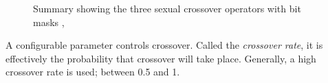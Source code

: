 \begin{figure}[tp]
   \begin{center}
   \end{center}
   \caption{Summary showing the three sexual crossover operators  with bit masks , }
   \label{fig:operators}
\end{figure}
A configurable parameter controls crossover. Called the \emph{crossover rate}, it is effectively the probability that crossover will take place. Generally, a high crossover rate is used; between 0.5 and 1\cite{4-ga, garates}.

